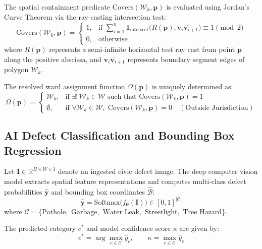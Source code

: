 \documentclass[12pt,a4paper]{report}
\begin{document}
The spatial containment predicate $\mathrm{Covers}(\mathcal{W}_k, \mathbf{p})$ is evaluated using Jordan's Curve Theorem via the ray-casting intersection test:
\begin{equation}
    \mathrm{Covers}(\mathcal{W}_k, \mathbf{p}) = \begin{cases}
        1, & \text{if } \sum_{i=1}^n \mathbf{1}_{\mathrm{intersect}}\big(R(\mathbf{p}), \overline{\mathbf{v}_i \mathbf{v}_{i+1}}\big) \equiv 1 \pmod 2 \\
        0, & \text{otherwise}
    \end{cases}
\end{equation}
where $R(\mathbf{p})$ represents a semi-infinite horizontal test ray cast from point $\mathbf{p}$ along the positive abscissa, and $\overline{\mathbf{v}_i \mathbf{v}_{i+1}}$ represents boundary segment edges of polygon $\mathcal{W}_k$.

The resolved ward assignment function $\Omega(\mathbf{p})$ is uniquely determined as:
\begin{equation}
    \Omega(\mathbf{p}) = \begin{cases}
        \mathcal{W}_k, & \text{if } \exists !\, \mathcal{W}_k \in \mathcal{W} \text{ such that } \mathrm{Covers}(\mathcal{W}_k, \mathbf{p}) = 1 \\
        \emptyset, & \text{if } \forall \mathcal{W}_k \in \mathcal{W}, \; \mathrm{Covers}(\mathcal{W}_k, \mathbf{p}) = 0 \quad (\text{Outside Jurisdiction})
    \end{cases}
\end{equation}

\subsection{AI Defect Classification and Bounding Box Regression}
Let $\mathbf{I} \in \mathbb{R}^{H \times W \times 3}$ denote an ingested civic defect image. The deep computer vision model extracts spatial feature representations and computes multi-class defect probabilities $\hat{\mathbf{y}}$ and bounding box coordinates $\hat{\mathcal{B}}$:
\begin{equation}
    \hat{\mathbf{y}} = \mathrm{Softmax}\big( f_{\boldsymbol{\theta}}(\mathbf{I}) \big) \in [0, 1]^{|\mathcal{C}|}
\end{equation}
where $\mathcal{C} = \{\text{Pothole},$ $\text{Garbage},$ $\text{Water Leak},$ $\text{Streetlight},$ $\text{Tree Hazard}\}$.

The predicted category $c^*$ and model confidence score $\kappa$ are given by:
\begin{equation}
    c^* = \arg\max_{c \in \mathcal{C}} \hat{y}_c, \qquad \kappa = \max_{c \in \mathcal{C}} \hat{y}_c
\end{equation}
\end{document}
